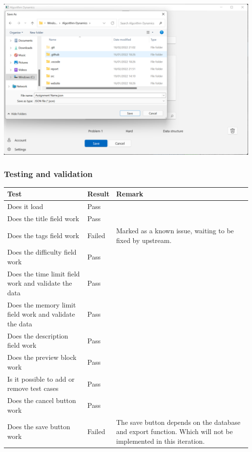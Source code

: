\documentclass[a4paper]{report}
\begin{document}
\includegraphics[width=\textwidth, height=\textheight, keepaspectratio]{CreateNewProblemListPage-FilePicker}

\subsubsection{Testing and validation}

\begin{tabulary}{\linewidth}{|L|l|L|}
    \hline
    Test & Result & Remark \\
    \hline
    Does it load & Pass & \\
    \hline
    Does the title field work & Pass &  \\
    \hline
    Does the tags field work & Failed & Marked as a known issue, waiting to be fixed by upstream. \\
    \hline
    Does the difficulty field work & Pass & \\
    \hline
    Does the time limit field work and validate the data & Pass & \\
    \hline
    Does the memory limit field work and validate the data & Pass & \\
    \hline
    Does the description field work & Pass & \\
    \hline
    Does the preview block work & Pass & \\
    \hline
    Is it possible to add or remove test cases & Pass & \\
    \hline
    Does the cancel button work & Pass & \\
    \hline
    Does the save button work & Failed & The save button depends on the database and export function. Which will not be implemented in this iteration. \\
    \hline
\end{tabulary}
\end{document}

